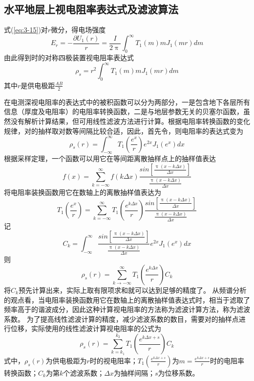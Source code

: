 \documentclass[hyperref,UTF-8,twoside]{ctexart}
\numberwithin{equation}{section}
\begin{document}
\subsection{水平地层上视电阻率表达式及滤波算法}
式(\ref{eq:3-15})对$r$微分，得电场强度
\begin{equation}
E_r=-\frac{\partial{U_1(r)}}{r}=\frac{I}{2\uppi}\int_0^\infty{T_1(m)mJ_1(mr)dm}\label{eq:3-17}
\end{equation}
由此得到时的对称四极装置视电阻率表达式
\begin{equation}
\rho_s=r^2\int_0^\infty{T_1(m)mJ_1(mr)dm}\label{eq:3-18}
\end{equation}
其中$r$是供电极距$\frac{AB}{2}$

在电测深视电阻率的表达式中的被积函数可以分为两部分，一是包含地下各层所有信息（厚度及电阻率）的电阻率转换函数，二是与地层参数无关的贝塞尔函数，虽然没有解析计算结果，但可用线性滤波方法进行计算。根据电阻率转换函数的变化规律，对的抽样取对数等间隔比较合适，因此，首先令，则电阻率的表达式变为
\begin{equation}
\rho_{s}(r)=\int_{-\infty}^\infty{T_1(\frac{e^x}{r})e^{2x}J_1(e^x)dx}\label{eq:3-19}
\end{equation}
根据采样定理，一个函数可以用它在等间距离散抽样点上的抽样值表达
\begin{equation}
f(x)=\sum_{k=-\infty}^{\infty}f(k\Delta x)\frac{sin[\frac{\uppi(x-k\Delta x)}{\Delta x}]}{\frac{\uppi(x-k\Delta x)}{\Delta x}}\label{eq:3-20}
\end{equation}
将电阻率装换函数用它在数轴上的离散抽样值表达为
\begin{equation}
T_1(\frac{e^x}{r})=\sum_{k=-\infty}^{\infty}T_1(\frac{e^{k\Delta x}}{r})\frac{sin[\frac{\uppi(x-k\Delta x)}{\Delta x}]}{\frac{\uppi(x-k\Delta x)}{\Delta x}}\label{eq:3-21}
\end{equation}
记
\begin{equation}
C_k=\int_{-\infty}^{\infty}\frac{sin[\frac{\uppi(x-k\Delta x)}{\Delta x}]}{\frac{\uppi(x-k\Delta x)}{\Delta x}}e^{2x}J_1(e^x)dx\label{eq:3-22}
\end{equation}
则
\begin{equation}
\rho_s(r)=\sum_{k\to -\infty}^{\infty}T_1(\frac{e^{k\Delta x}}{r})C_k\label{eq:3-23}
\end{equation}
将$C_k$预先计算出来，实际上取有限项求和就可以达到足够的精度了。
从频谱分析的观点看，当电阻率装换函数用它在数轴上的离散抽样值表达式时，相当于滤取了频率高于的谐波成分，因此这种计算视电阻率的方法称为滤波计算方法，称为滤波系数。
为了提高线性滤波计算的精度，减少滤波系数的数目，需要对的抽样点进行位移，实际使用的线性滤波计算视电阻率的公式为
\begin{equation}
\rho_s(r)=\sum_{k=k_1}^{k_2}T_1(\frac{e^{k\Delta x+s}}{r})C_k\label{eq:3-24}
\end{equation}
式中，$\rho_s(r)$为供电极距为$r$时的视电阻率；$T_1(\frac{e^{k\Delta x+s}}{r})$为$m=\frac{e^{k\Delta x+s}}{r}$时的电阻率转换函数；$C_k$为第$k$个滤波系数；$\Delta x$为抽样间隔；$s$为位移系数。
\end{document}
